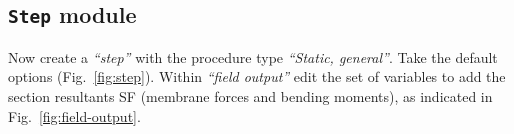\documentclass[english,a4paper,12pt]{article}
\begin{document}
\subsection{\texttt{Step} module}

Now create a \emph{``step''} with the procedure type \emph{``Static, general''}.
Take the default options (Fig.~\ref{fig:step}).
Within \emph{``field output''} edit the set of variables to add the section resultants SF (membrane forces and bending moments), as indicated in Fig.~\ref{fig:field-output}.
\end{document}
